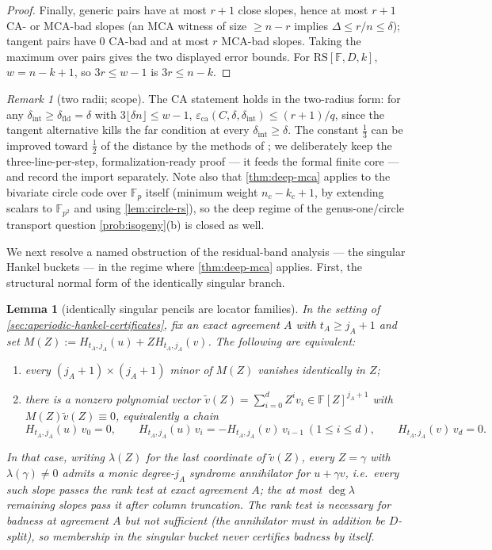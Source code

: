 \documentclass[11pt]{article}
\newtheorem{lemma}[lemma]{Lemma}
\theoremstyle{definition}
\theoremstyle{remark}
\newtheorem{remark}[remark]{Remark}
\newcommand{\F}{\mathbb{F}}
\newcommand{\RS}{\mathrm{RS}}
\newcommand{\eca}{\varepsilon_{\mathrm{ca}}}
\newcommand{\dist}{\Delta}
\begin{document}
\begin{proof}
Finally, generic pairs have at most $r+1$ close slopes, hence at most $r+1$ CA- or MCA-bad slopes (an MCA witness of size $\ge n-r$ implies $\dist\le r/n\le\delta$); tangent pairs have $0$ CA-bad and at most $r$ MCA-bad slopes. Taking the maximum over pairs gives the two displayed error bounds. For $\RS[\F,D,k]$, $w=n-k+1$, so $3r\le w-1$ is $3r\le n-k$.
\end{proof}

\begin{remark}[two radii; scope]
The CA statement holds in the two-radius form: for any $\delta_{\mathrm{int}}\ge\delta_{\mathrm{fld}}=\delta$ with $3\lfloor\delta n\rfloor\le w-1$, $\eca(C,\delta,\delta_{\mathrm{int}})\le(r+1)/q$, since the tangent alternative kills the far condition at every $\delta_{\mathrm{int}}\ge\delta$. The constant $\frac13$ can be improved toward $\frac12$ of the distance by the methods of \cite{BCHKS25}; we deliberately keep the three-line-per-step, formalization-ready proof --- it feeds the formal finite core --- and record the import separately. Note also that \cref{thm:deep-mca} applies to the bivariate circle code over $\F_p$ itself \textup(minimum weight $n_c-k_c+1$, by extending scalars to $\F_{p^2}$ and using \cref{lem:circle-rs}\textup), so the deep regime of the genus-one/circle transport question \cref{prob:isogeny}\textup{(b)} is closed as well.
\end{remark}

We next resolve a named obstruction of the residual-band analysis --- the singular Hankel buckets --- in the regime where \cref{thm:deep-mca} applies. First, the structural normal form of the identically singular branch.

\begin{lemma}[identically singular pencils are locator families]\label{lem:singular-pencil}
In the setting of \cref{sec:aperiodic-hankel-certificates}, fix an exact agreement $A$ with $t_A\ge j_A+1$ and set $M(Z):=H_{t_A,j_A}(u)+ZH_{t_A,j_A}(v)$. The following are equivalent:
\begin{enumerate}[label=\textup{(\roman*)}]
\item every $(j_A+1)\times(j_A+1)$ minor of $M(Z)$ vanishes identically in $Z$;
\item there is a nonzero polynomial vector $\widetilde v(Z)=\sum_{i=0}^{d}Z^iv_i\in\F[Z]^{j_A+1}$ with $M(Z)\widetilde v(Z)\equiv0$, equivalently a chain
\[
H_{t_A,j_A}(u)\,v_0=0,\qquad
H_{t_A,j_A}(u)\,v_{i}=-H_{t_A,j_A}(v)\,v_{i-1}\ (1\le i\le d),\qquad
H_{t_A,j_A}(v)\,v_d=0 .
\]
\end{enumerate}
In that case, writing $\lambda(Z)$ for the last coordinate of $\widetilde v(Z)$, every $Z=\gamma$ with $\lambda(\gamma)\ne0$ admits a monic degree-$j_A$ syndrome annihilator for $u+\gamma v$, i.e.\ every such slope passes the rank test at exact agreement $A$; the at most $\deg\lambda$ remaining slopes pass it after column truncation. The rank test is necessary for badness at agreement $A$ but not sufficient \textup(the annihilator must in addition be $D$-split\textup), so membership in the singular bucket never certifies badness by itself.
\end{lemma}
\end{document}
